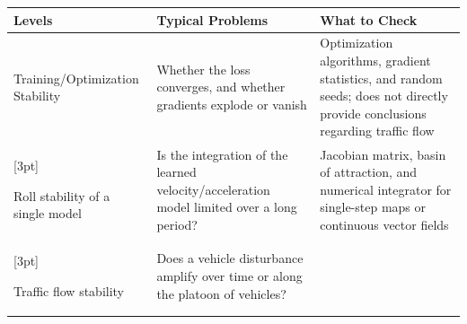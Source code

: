 \documentclass[11pt,a4paper,openany]{book}
\numberwithin{equation}{chapter}
\numberwithin{figure}{chapter}
\numberwithin{table}{chapter}
\begin{document}
\begin{center}
\small
{}
\label{tab:ml-four-stabilities}
\begin{tabular}{p{3.2cm}p{4.2cm}p{6.8cm}}
\toprule
\textbf{Levels} & \textbf{Typical Problems} & \textbf{What to Check} \\
\midrule







Training/Optimization Stability




&




 Whether the loss converges, and whether gradients explode or vanish




&




 Optimization algorithms, gradient statistics, and random seeds; does not directly provide conclusions regarding traffic flow\\

[3pt]

Roll stability of a single model






&






Is the integration of the learned velocity/acceleration model limited over a long period?






&






Jacobian matrix, basin of attraction, and numerical integrator for single-step maps or continuous vector fields





\\

[3pt]

Traffic flow stability






&






Does a vehicle disturbance amplify over time or along the platoon of vehicles?


\end{tabular}
\end{center}
\end{document}

